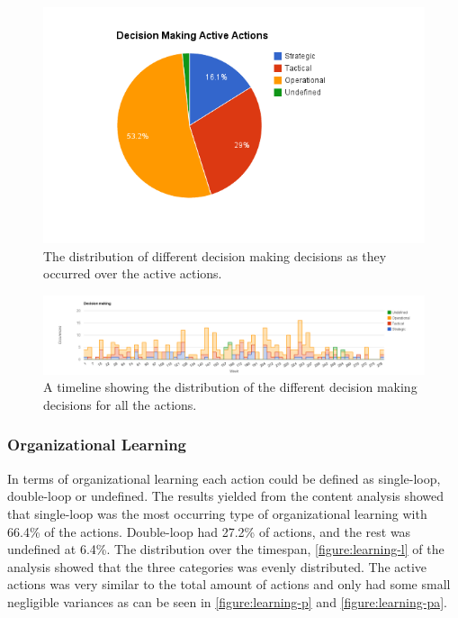\begin{figure}[!h]
	\centering
	\includegraphics[width=\textwidth, keepaspectratio]{figures/decision-pa.png}
	\caption{The distribution of different decision making decisions as they occurred over the active actions.}
	\label{figure:decision-pa}
\end{figure}

\begin{figure}
	\centering
	\includegraphics[width=\textwidth, keepaspectratio]{figures/decision-l.png}
	\caption{A timeline showing the distribution of the different decision making decisions for all the actions.}
	\label{figure:decision-l}
\end{figure}
\clearpage

\subsubsection{Organizational Learning}
In terms of organizational learning each action could be defined as single-loop, double-loop or undefined. The results yielded from the content analysis showed that single-loop was the most occurring type of organizational learning with 66.4\% of the actions. Double-loop had 27.2\% of actions, and the rest was undefined at 6.4\%. The distribution over the timespan, \autoref{figure:learning-l} of the analysis showed that the three categories was evenly distributed. The active actions was very similar to the total amount of actions and only had some small negligible variances as can be seen in \autoref{figure:learning-p} and \autoref{figure:learning-pa}.

